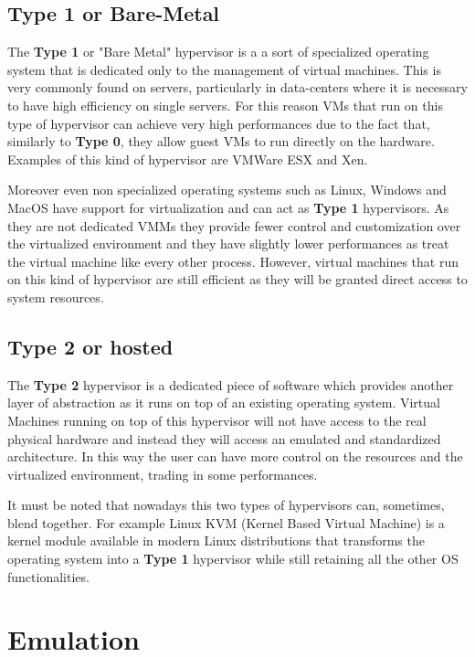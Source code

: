 \subsection{Type 1 or Bare-Metal}

The \textbf{Type 1} or "Bare Metal" hypervisor is a a sort of specialized operating system that is dedicated only to the management of virtual machines. This is very commonly found on servers, particularly in data-centers where it is necessary to have high efficiency on single servers. For this reason VMs that run on this type of hypervisor can achieve very high performances due to the fact that, similarly to \textbf{Type 0}, they allow guest VMs to run directly on the hardware. Examples of this kind of hypervisor are VMWare ESX and Xen.

Moreover even non specialized operating systems such as Linux, Windows and MacOS have support for virtualization and can act as \textbf{Type 1} hypervisors. As they are not dedicated VMMs they provide fewer control and customization over the virtualized environment and they have slightly lower performances as treat the virtual machine like every other process. However, virtual machines that run on this kind of hypervisor are still efficient as they will be granted direct access to system resources. 

\subsection{Type 2 or hosted}

The \textbf{Type 2 }hypervisor is a dedicated piece of software which provides another layer of abstraction as it runs on top of an existing operating system. Virtual Machines running on top of this hypervisor will not have access to the real physical hardware and instead they will access an emulated and standardized architecture. In this way the user can have more control on the resources and the virtualized environment, trading in some performances. 

It must be noted that nowadays this two types of hypervisors can, sometimes, blend together. For example Linux KVM (Kernel Based Virtual Machine) is a kernel module available in modern Linux distributions that transforms the operating system into a \textbf{Type 1} hypervisor while still retaining all the other OS functionalities.


\section{Emulation}

